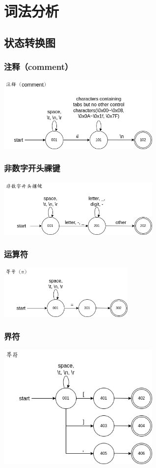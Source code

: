 \section{词法分析}


\subsection{状态转换图}


\subsubsection{注释（comment）}
\noindent\includegraphics[width=0.6\textwidth]{images/状态转换图之注释.png}


\subsubsection{非数字开头祼键}
\noindent\includegraphics[width=0.6\textwidth]{images/状态转换图之非数字祼键.png}


\subsubsection{运算符}
\noindent\includegraphics[width=0.5\textwidth]{images/状态转换图之等号.png}


\subsubsection{界符}
\noindent\includegraphics[width=0.6\textwidth]{images/状态转换图之界符.png}


